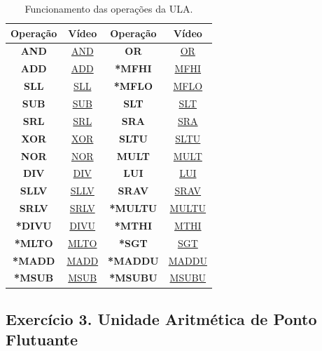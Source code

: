 \documentclass[12pt]{article}
\begin{document}
\begin{table}[H]
	\centering
	\begin{tabular}{|c|c|c|c|}
		\hline
		\textbf{Operação} & \textbf{Vídeo} & \textbf{Operação} & \textbf{Vídeo} \\
		\hline
		\textbf{AND} & \href{https://youtu.be/3rOvkaxYP6Q}{AND}  & \textbf{OR} & \href{https://youtu.be/sCqV4z5Az1Q}{OR} \\\hline
		\textbf{ADD} &  \href{https://youtu.be/PtU2MOLjm94}{ADD} & \textbf{*MFHI} &  \href{}{MFHI} \\\hline
		\textbf{SLL} &  \href{https://youtu.be/oegfAdN_HYc}{SLL}  & \textbf{*MFLO} &  \href{}{MFLO}  \\\hline
		\textbf{SUB} &  \href{https://youtu.be/jSYAjTycOTo}{SUB}  & \textbf{SLT} &  \href{https://youtu.be/I3R0-LyBugU}{SLT}  \\\hline
		\textbf{SRL} &  \href{https://youtu.be/wdsBH2myWbc}{SRL} & \textbf{SRA} &  \href{https://youtu.be/aSTUbG23kdI}{SRA}   \\\hline
		\textbf{XOR}  &  \href{}{XOR}  & \textbf{SLTU} &  \href{https://youtu.be/IazxX0OtrLE}{SLTU} \\\hline
		\textbf{NOR} &  \href{}{NOR} & \textbf{MULT} &  \href{https://youtu.be/TvRZG23bw78}{MULT} \\\hline
		\textbf{DIV} &  \href{https://youtu.be/l3nE2rxqUuY}{DIV}  & \textbf{LUI} &  \href{https://youtu.be/lTs8LDFBiIE}{LUI} \\\hline
		\textbf{SLLV} &  \href{https://youtu.be/e2SjS3GcqtE}{SLLV}  & \textbf{SRAV} &  \href{}{SRAV} \\\hline
		\textbf{SRLV} &  \href{}{SRLV}  & \textbf{*MULTU} &  \href{}{MULTU} \\\hline
		\textbf{*DIVU} &  \href{}{DIVU}  & \textbf{*MTHI}  &  \href{}{MTHI} \\\hline
		\textbf{*MLTO} &  \href{}{MLTO}  & \textbf{*SGT} &  \href{}{SGT} \\\hline
		\textbf{*MADD} &  \href{}{MADD}  & \textbf{*MADDU} &  \href{}{MADDU} \\\hline
		\textbf{*MSUB} &  \href{}{MSUB}  & \textbf{*MSUBU}  &  \href{}{MSUBU} \\\hline
	\end{tabular}
	\caption{Funcionamento das operações da ULA.}
	\label{tab:youtubeULA}
\end{table}


\subsection{Exercício 3. Unidade Aritmética de Ponto Flutuante }
\label{subsec:ulafloat}
\end{document}
